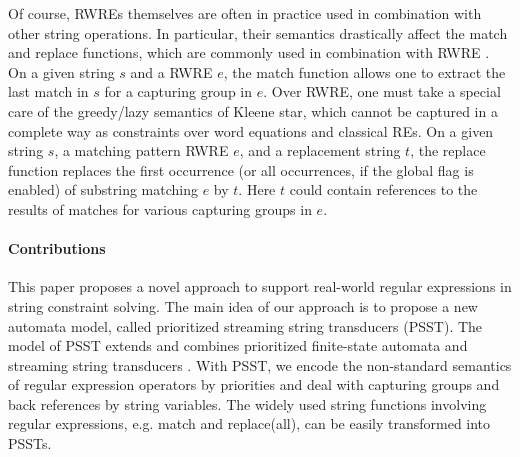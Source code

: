 Of course, RWREs themselves are often in practice used in combination with
other string operations. In particular, their semantics drastically affect
the match and replace functions, which are commonly used in combination with
RWRE \cite{LMK19}. On a given string $s$ and a RWRE $e$, the match
function allows one to extract the last match in $s$ for a 
capturing group in $e$. Over RWRE, one must take a special care of the
greedy/lazy semantics of Kleene star, which cannot 
be captured in a complete way as constraints over word equations and classical 
REs. On a given string $s$, a matching pattern RWRE $e$, and a replacement 
string $t$, the replace function replaces the first occurrence (or all 
occurrences,
if the global flag is enabled) of substring matching $e$ by $t$. Here $t$
could contain references to the results of matches for various capturing groups
in $e$. 



\paragraph*{Contributions}
This paper proposes a novel approach to support real-world regular expressions in string constraint solving. The main idea of our approach is to propose a new automata model, called prioritized streaming string transducers (PSST). The model of PSST extends and combines prioritized finite-state automata \cite{BM17} and streaming string transducers \cite{AC10,AD11}. With PSST, we encode the non-standard semantics of regular expression operators by priorities and deal with capturing groups and back references by string variables. 
The widely used string functions involving regular expressions, e.g. match and replace(all), can be easily transformed into PSSTs. 

